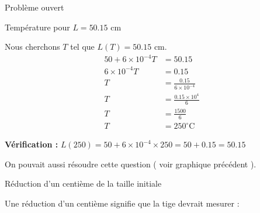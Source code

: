 \begin{EXO}{Problème ouvert}{}
\begin{center}
\end{center}

\begin{tcbenumerate}[2]
\tcbitem Température pour $L = \num{50.15}$ cm
\begin{tcolorbox}[
    colback=blue!10,
    colframe=blue!50!black,
    title={\faThermometerHalf\space Résolution :}
]
Nous cherchons $T$ tel que $L(T) = \num{50.15}$ cm.
\begin{align*}
50 + 6 \times 10^{-4} T &= \num{50.15}\\[0.15cm]
6 \times 10^{-4} T &= \num{0.15}\\[0.15cm]
T &= \frac{\num{0.15}}{6 \times 10^{-4}}\\[0.15cm]
T &= \frac{\num{0.15} \times 10^{4}}{6}\\[0.15cm]
T &= \frac{1500}{6}\\[0.15cm]
T &= \boxed{250 ^\circ\text{C}}
\end{align*}

\textbf{Vérification :} $L(250) = 50 + 6 \times 10^{-4} \times 250 = 50 + \num{0.15} = \num{50.15}$ 

\bcoeil On pouvait aussi résoudre  cette question ( voir graphique précédent ).
\end{tcolorbox}

\tcbitem Réduction d'un centième de la taille initiale

\begin{tcolorbox}[
    colback=red!10,
    colframe=red!50!black,
    title={\faSnowflake\space Analyse de la contraction thermique :}
]
Une réduction d'un centième signifie que la tige devrait mesurer : 


\end{tcolorbox}
\end{tcbenumerate}
\end{EXO}
